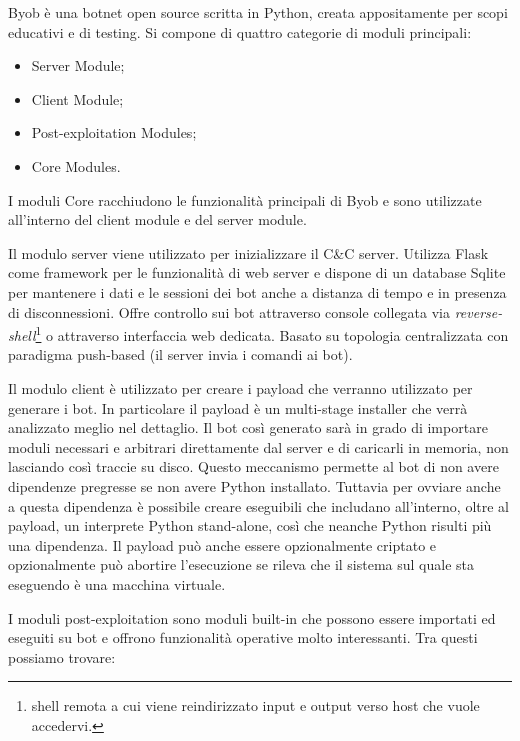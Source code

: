 Byob \cite{byob} è una botnet open source scritta in Python, creata appositamente per scopi educativi e di testing.
Si compone di quattro categorie di moduli principali:
\begin{itemize}
    \item Server Module;
    \item Client Module;
    \item Post-exploitation Modules;
    \item Core Modules.
\end{itemize}

I moduli Core racchiudono le funzionalità principali di Byob e sono utilizzate all'interno del client module e del server module.  

Il modulo server viene utilizzato per inizializzare il C\&C server. Utilizza Flask \cite{flask} come framework per le funzionalità di web server e  dispone di un database Sqlite \cite{sqlite} per mantenere i dati e le sessioni dei bot anche a distanza di tempo e in presenza di disconnessioni. Offre controllo sui bot attraverso console collegata via \textit{reverse-shell}\footnote{shell remota a cui viene reindirizzato input e output verso host che vuole accedervi.} o attraverso interfaccia web dedicata. Basato su topologia centralizzata con paradigma push-based (il server invia i comandi ai bot).

Il modulo client è utilizzato per creare i payload che verranno utilizzato per generare i bot. In particolare il payload è un multi-stage installer che verrà analizzato meglio nel dettaglio.  Il bot così generato sarà in grado di importare moduli necessari e arbitrari direttamente dal server e di caricarli in memoria, non lasciando così traccie su disco. Questo meccanismo permette al bot di non avere dipendenze pregresse se non avere Python installato. Tuttavia per ovviare anche a questa dipendenza è possibile creare eseguibili che includano all'interno, oltre al payload, un interprete Python stand-alone, così che neanche Python risulti più una dipendenza.  Il payload può anche essere opzionalmente criptato e opzionalmente può abortire l'esecuzione se rileva che il sistema sul quale sta eseguendo è una macchina virtuale.

I moduli post-exploitation sono moduli built-in che possono essere importati ed eseguiti su bot e offrono funzionalità operative molto interessanti.
Tra questi possiamo trovare:

